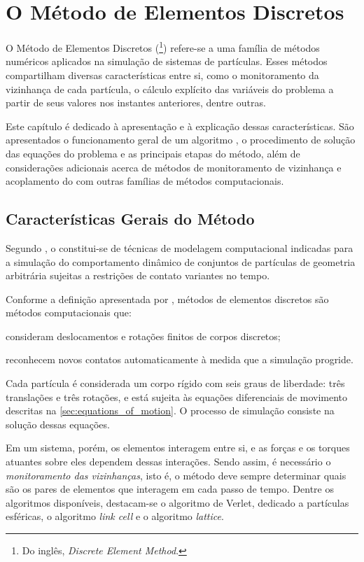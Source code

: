 \chapter{O Método de Elementos Discretos} \label{ch:discrete_element_method}

O Método de Elementos Discretos (\DEM{}\footnote{Do inglês, \textit{Discrete Element Method}.}) refere-se a uma família de métodos numéricos aplicados na simulação de sistemas de partículas. Esses métodos compartilham diversas características entre si, como o monitoramento da vizinhança de cada partícula, o cálculo explícito das variáveis do problema a partir de seus valores nos instantes anteriores, dentre outras.

Este capítulo é dedicado à apresentação e à explicação dessas características. São apresentados o funcionamento geral de um algoritmo \DEM{}, o procedimento de solução das equações do problema e as principais etapas do método, além de considerações adicionais acerca de métodos de monitoramento de vizinhança e acoplamento do \DEM{} com outras famílias de métodos computacionais.

\section{Características Gerais do Método}

Segundo , o \DEM{} constitui-se de técnicas de modelagem computacional indicadas para a simulação do comportamento dinâmico de conjuntos de partículas de geometria arbitrária sujeitas a restrições de contato variantes no tempo.

Conforme a definição apresentada por , métodos de elementos discretos são métodos computacionais que:
\begin{alineas}
	\item consideram deslocamentos e rotações finitos de corpos discretos;
	\item reconhecem novos contatos automaticamente à medida que a simulação progride.
\end{alineas}

Cada partícula é considerada um corpo rígido com seis graus de liberdade: três translações e três rotações, e está sujeita às equações diferenciais de movimento descritas na \cref{sec:equations_of_motion}. O processo de simulação consiste na solução dessas equações. 

Em um sistema, porém, os elementos interagem entre si, e as forças e os torques atuantes sobre eles dependem dessas interações. Sendo assim, é necessário o \textit{monitoramento das vizinhanças}, isto é, o método deve sempre determinar quais são os pares de elementos que interagem em cada passo de tempo. Dentre os algoritmos disponíveis, destacam-se o algoritmo de Verlet, dedicado a partículas esféricas, o algoritmo \textit{link cell} e o algoritmo \textit{lattice}.

